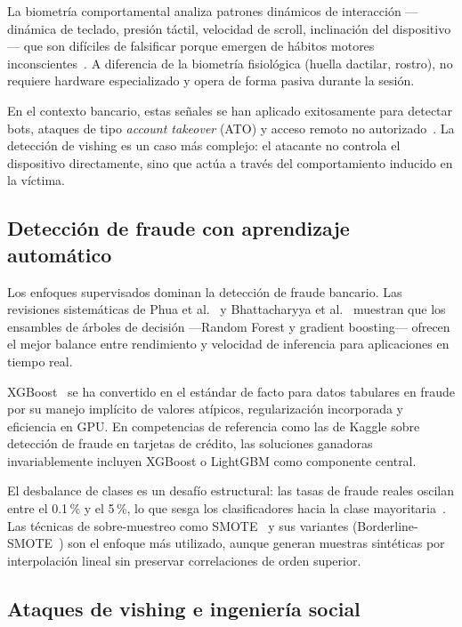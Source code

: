 \documentclass[journal]{IEEEtran}
\begin{document}
La biometría comportamental analiza patrones dinámicos de interacción
---dinámica de teclado, presión táctil, velocidad de scroll, inclinación del
dispositivo--- que son difíciles de falsificar porque emergen de hábitos
motores inconscientes~\cite{fridman2017active, sundararajan2020behavioral}.
A diferencia de la biometría fisiológica (huella dactilar, rostro), no
requiere hardware especializado y opera de forma pasiva durante la sesión.

En el contexto bancario, estas señales se han aplicado exitosamente para
detectar bots, ataques de tipo \textit{account takeover} (ATO) y acceso
remoto no autorizado~\cite{biocatch2022}. La detección de vishing es un
caso más complejo: el atacante no controla el dispositivo directamente, sino
que actúa a través del comportamiento inducido en la víctima.

\subsection{Detección de fraude con aprendizaje automático}

Los enfoques supervisados dominan la detección de fraude bancario. Las
revisiones sistemáticas de Phua et al.~\cite{phua2010comprehensive} y
Bhattacharyya et al.~\cite{bhattacharyya2011data} muestran que los
ensambles de árboles de decisión ---Random Forest y gradient
boosting--- ofrecen el mejor balance entre rendimiento y velocidad de
inferencia para aplicaciones en tiempo real.

XGBoost~\cite{chen2016xgboost} se ha convertido en el estándar de facto para
datos tabulares en fraude por su manejo implícito de valores atípicos,
regularización incorporada y eficiencia en GPU. En competencias de referencia
como las de Kaggle sobre detección de fraude en tarjetas de crédito, las
soluciones ganadoras invariablemente incluyen XGBoost o LightGBM como
componente central.

El desbalance de clases es un desafío estructural: las tasas de fraude reales
oscilan entre el 0.1\,\% y el 5\,\%, lo que sesga los clasificadores hacia
la clase mayoritaria~\cite{he2009learning, krawczyk2016learning}. Las técnicas
de sobre-muestreo como SMOTE~\cite{chawla2002smote} y sus variantes
(Borderline-SMOTE~\cite{han2005borderline}) son el enfoque más utilizado,
aunque generan muestras sintéticas por interpolación lineal sin preservar
correlaciones de orden superior.

\subsection{Ataques de vishing e ingeniería social}
\end{document}
